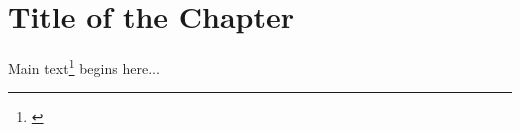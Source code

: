 \documentclass[12pt,twoside]{reedthesis}
\begin{document}
	
  \mainmatter %
  \pagestyle{fancyplain} %

    \chapter{Title of the Chapter}
	
Main text\footnote{\cite{angel:2000}} begins here...

  \backmatter %
  
 
 
\end{document}
